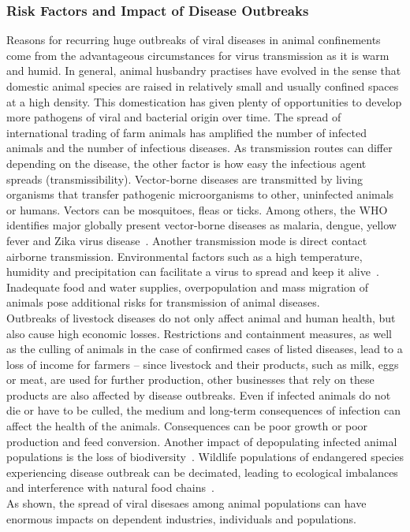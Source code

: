 \subsubsection*{Risk Factors and Impact of Disease Outbreaks}
Reasons for recurring huge outbreaks of viral diseases in animal confinements come from the advantageous circumstances for virus transmission as it is warm and humid. In general, animal husbandry practises have evolved in the sense that domestic animal species are raised in relatively small and usually confined spaces at a high density. This domestication has given plenty of opportunities to develop more pathogens of viral and bacterial origin over time. The spread of international trading of farm animals has amplified the number of infected animals and the number of infectious diseases. As transmission routes can differ depending on the disease, the other factor is how easy the infectious agent spreads (transmissibility). Vector-borne diseases are transmitted by living organisms that transfer pathogenic microorganisms to other, uninfected animals or humans. Vectors can be mosquitoes, fleas or ticks. Among others, the \ac{WHO} identifies major globally present vector-borne diseases as malaria, dengue, yellow fever and Zika virus disease~\cite{world2017global}. Another transmission mode is direct contact airborne transmission. Environmental factors such as a high temperature, humidity and precipitation can facilitate a virus to spread and keep it alive~\cite{eccles2002explanation}. Inadequate food and water supplies, overpopulation and mass migration of animals pose additional risks for transmission of animal diseases. \\
Outbreaks of livestock diseases do not only affect animal and human health, but also cause high economic losses. Restrictions and containment measures, as well as the culling of animals in the case of confirmed cases of listed diseases, lead to a loss of income for farmers -- since livestock and their products, such as milk, eggs or meat, are used for further production, other businesses that rely on these products are also affected by disease outbreaks. Even if infected animals do not die or have to be culled, the medium and long-term consequences of infection can affect the health of the animals. Consequences can be poor growth or poor production and feed conversion. Another impact of depopulating infected animal populations is the loss of biodiversity~\cite{lacroix2014non, morand2020emerging}. Wildlife populations of endangered species experiencing disease outbreak can be decimated, leading to ecological imbalances and interference with natural food chains~\cite{reid2010global, civitello2015biodiversity, espinosa2020infectious}. \\
As shown, the spread of viral disesaes among animal populations can have enormous impacts on dependent industries, individuals and populations.

